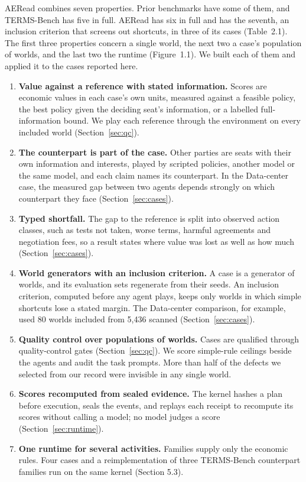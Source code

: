 AERead combines seven properties. Prior benchmarks have some of them, and
TERMS-Bench has five in full. AERead has six in full and has the seventh, an
inclusion criterion that screens out shortcuts, in three of its cases (Table~2.1). The first three
properties concern a single world, the next two a case's population of worlds, and the
last two the runtime (Figure~1.1). We built each of them and applied it to the
cases reported here.
\begin{enumerate}
\item \textbf{Value against a reference with stated information.} Scores
are economic values in each case's own units, measured against a feasible
policy, the best policy given the deciding seat's information, or a
labelled full-information bound. We play each reference through the
environment on every included world (Section~\ref{sec:qc}).
\item \textbf{The counterpart is part of the case.} Other parties are seats
with their own information and interests, played by scripted policies,
another model or the same model, and each claim names its counterpart. In
the Data-center case, the measured gap between two agents depends strongly on
which counterpart they face (Section~\ref{sec:cases}).
\item \textbf{Typed shortfall.} The gap to the reference is split into
observed action classes, such as tests not taken, worse terms, harmful
agreements and negotiation fees, so a result states where value was lost
as well as how much (Section~\ref{sec:cases}).
\item \textbf{World generators with an inclusion criterion.} A case is a generator of
worlds, and its evaluation sets regenerate from their seeds. An inclusion criterion,
computed before any agent plays, keeps only worlds in which simple
shortcuts lose a stated margin. The Data-center comparison, for example, used 80
worlds included from 5,436 scanned (Section~\ref{sec:cases}).
\item \textbf{Quality control over populations of worlds.} Cases are
qualified through quality-control gates (Section~\ref{sec:qc}). We score simple-rule ceilings beside the
agents and audit the task prompts. More than half of the defects we selected
from our record were invisible in any single world.
\item \textbf{Scores recomputed from sealed evidence.} The kernel hashes a
plan before execution, seals the events, and replays each receipt to
recompute its scores without calling a model; no model judges a score
(Section~\ref{sec:runtime}).
\item \textbf{One runtime for several activities.} Families supply only the
economic rules. Four cases and a reimplementation of three
TERMS-Bench counterpart families run on the same kernel
(Section 5.3).
\end{enumerate}
